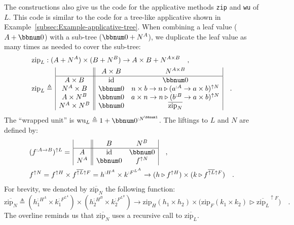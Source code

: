 The constructions also give us the code for the applicative methods
\lstinline!zip! and \lstinline!wu! of $L$. This code is similar
to the code for a tree-like applicative shown in Example~\ref{subsec:Example-applicative-tree}.
When combining a leaf value ($A+\bbnum 0$) with a sub-tree ($\bbnum 0+N^{A}$),
we duplicate the leaf value as many times as needed to cover the sub-tree:
\begin{align*}
 & \text{zip}_{L}:(A+N^{A})\times(B+N^{B})\rightarrow A\times B+N^{A\times B}\quad,\\
 & \text{zip}_{L}\triangleq\,\begin{array}{|c||cc|}
 & A\times B & N^{A\times B}\\
\hline A\times B & \text{id} & \bbnum 0\\
N^{A}\times B & \bbnum 0 & n\times b\rightarrow n\triangleright(a^{:A}\rightarrow a\times b)^{\uparrow N}\\
A\times N^{B} & \bbnum 0 & a\times n\rightarrow n\triangleright(b^{:B}\rightarrow a\times b)^{\uparrow N}\\
N^{A}\times N^{B} & \bbnum 0 & \overline{\text{zip}_{N}}
\end{array}\quad.
\end{align*}
The \textsf{``}wrapped unit\textsf{''} is $\text{wu}_{L}\triangleq1+\bbnum 0^{:N^{\bbnum 1}}$.
The liftings to $L$ and $N$ are defined by:
\begin{align*}
 & (f^{:A\rightarrow B})^{\uparrow L}=\,\begin{array}{|c||cc|}
 & B & N^{B}\\
\hline A & \text{id} & \bbnum 0\\
N^{A} & \bbnum 0 & f^{\uparrow N}
\end{array}\quad,\\
 & f^{\uparrow N}=f^{\uparrow H}\times f^{\overline{\uparrow L}\uparrow F}=h^{:H^{A}}\times k^{:F^{L^{A}}}\rightarrow(h\triangleright f^{\uparrow H})\times(k\triangleright f^{\overline{\uparrow L}\uparrow F})\quad.
\end{align*}
For brevity, we denoted by $\overline{\text{zip}_{N}}$ the following
function:
\[
\overline{\text{zip}_{N}}\triangleq(h_{1}^{:H^{A}}\times k_{1}^{:F^{L^{A}}})\times(h_{2}^{:H^{B}}\times k_{2}^{:F^{L^{B}}})\rightarrow\text{zip}_{H}(h_{1}\times h_{2})\times\big(\text{zip}_{F}(k_{1}\times k_{2})\triangleright\overline{\text{zip}_{L}}^{\uparrow F}\big)\quad.
\]
The overline reminds us that $\overline{\text{zip}_{N}}$ uses a recursive
call to $\overline{\text{zip}_{L}}$. %
